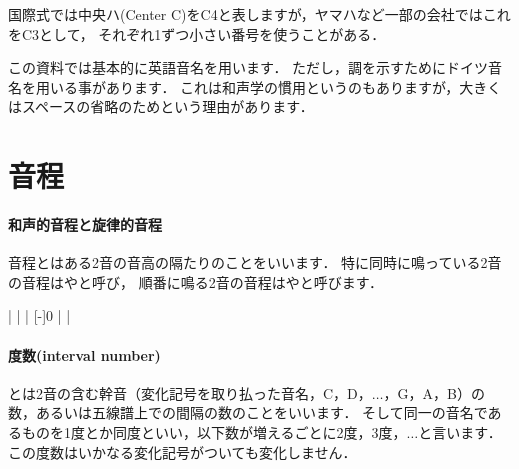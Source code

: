 \documentclass[dvipdfmx,uplatex,b5paper,openany,jbase=12Q,nomag*,textwidth-limit=44%
               ]{gachimuchi}
\begin{document}
\begin{chuui}
国際式では中央ハ(Center C)をC4と表しますが，ヤマハなど一部の会社ではこれをC3として，
それぞれ1ずつ小さい番号を使うことがある．
\end{chuui}

この資料では基本的に英語音名を用います．
ただし，調を示すためにドイツ音名を用いる事があります．
これは和声学の慣用というのもありますが，大きくはスペースの省略のためという理由があります．

\section{音程}
\paragraph{和声的音程と旋律的音程}
音程とはある2音の音高の隔たりのことをいいます．
特に同時に鳴っている2音の音程はやと呼び，
順番に鳴る2音の音程はやと呼びます．

\begin{Music}
  \nostartrule%
  \Startpiece%
  \NOtes{}%
  \en\bar%
  \NOTes%
  \en\NOtes%
  \en\bar%
  \NOTes%
  \en\bar%
  \NOTEs%
  \en\setdoublebar
  \endpiece%
  \Startpiece%
  \NOtesp{}%
  \en\Notes%
  \en\NOtes%
  [-\QNwidth]{0}%
  \en\bar%
  \NOtes%
  \en\bar%
  \NOTes%
  \Mryaku\sk%
  \en\setdoublebar
  \endpiece%
\end{Music}


\paragraph{度数(interval number)}
とは2音の含む幹音（変化記号を取り払った音名，C，D，$\dots$，G，A，B）の数，あるいは五線譜上での間隔の数のことをいいます．
そして同一の音名であるものを1度とか同度といい，以下数が増えるごとに2度，3度，$\dots$と言います．
この度数はいかなる変化記号がついても変化しません．
\end{document}
